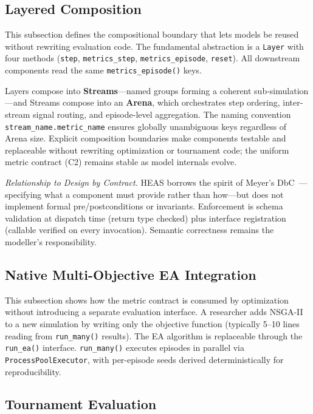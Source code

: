 \documentclass{wscpaperproc}
\begin{document}
\subsection{Layered Composition}

This subsection defines the compositional boundary that lets models be reused
without rewriting evaluation code. The fundamental abstraction is a
\texttt{Layer} with four methods
(\texttt{step}, \texttt{metrics\_step}, \texttt{metrics\_episode},
\texttt{reset}). All downstream components read the same
\texttt{metrics\_episode()} keys.

Layers compose into \textbf{Streams}---named groups forming a coherent
sub-simulation---and Streams compose into an \textbf{Arena}, which orchestrates
step ordering, inter-stream signal routing, and episode-level aggregation. The
naming convention \texttt{stream\_name.metric\_name} ensures globally unambiguous
keys regardless of Arena size. Explicit composition boundaries make components
testable and replaceable without rewriting optimization or tournament code;
the uniform metric contract (C2) remains stable as model internals evolve.

\textit{Relationship to Design by Contract.} HEAS borrows the spirit of
Meyer's DbC~\cite{meyer1997object}---specifying what a component must provide
rather than how---but does not implement formal pre/postconditions or invariants.
Enforcement is schema validation at dispatch time (return type checked) plus
interface registration (callable verified on every invocation). Semantic
correctness remains the modeller's responsibility.

\subsection{Native Multi-Objective EA Integration}

This subsection shows how the metric contract is consumed by optimization
without introducing a separate evaluation interface. A researcher adds
NSGA-II to a new simulation by writing only the objective function (typically
5--10 lines reading from \texttt{run\_many()} results). The EA algorithm is
replaceable through the \texttt{run\_ea()} interface. \texttt{run\_many()}
executes episodes in parallel via \texttt{ProcessPoolExecutor}, with per-episode
seeds derived deterministically for reproducibility.

\subsection{Tournament Evaluation}
\end{document}
